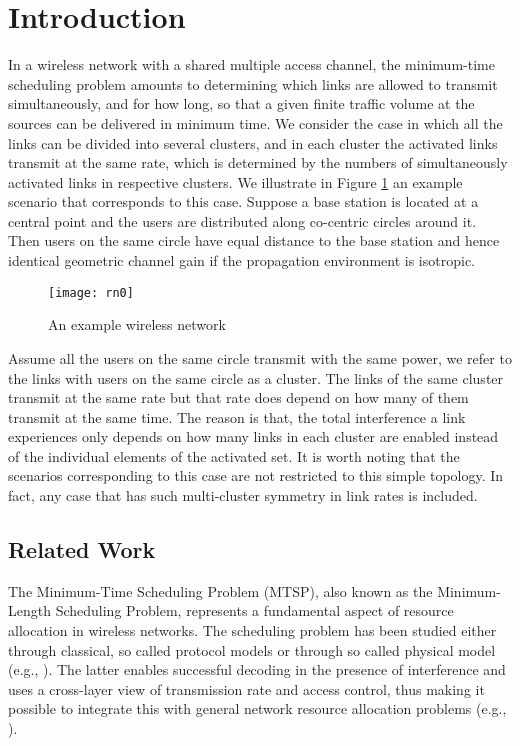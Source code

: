 \documentclass[10pt,onecolumn,journal,draftcls,oneside]{IEEEtran}
\newcounter{exam}
\begin{document}
\section{Introduction}
\label{sec:introduction}

In a wireless network with a shared multiple access channel, the minimum-time scheduling problem amounts to determining which links are allowed to transmit simultaneously, and for how long, so that a given finite traffic volume at the sources can be delivered in minimum time. We consider the case in which all the links can be divided into several clusters, and in each cluster the activated links transmit at the same rate, which is determined by the numbers of simultaneously activated links in respective clusters. We illustrate in Figure \ref{fig:rn} an example scenario that corresponds to this case. Suppose a base station is located at a central point and the users are distributed along co-centric circles around it. Then users on the same circle have equal distance to the base station and hence identical geometric channel gain if the propagation environment is isotropic.

\begin{figure} [ht!]	
\centering
{\texttt{[image: rn0]}}
\vspace{-2mm}
\caption{An example wireless network}
\label{fig:rn}
\end{figure}

Assume all the users on the same circle transmit with the same power, we refer to the links with users on the same circle as a cluster. The links of the same cluster transmit at the same rate but that rate does depend on how many of them transmit at the same time. The reason is that, the total interference a link experiences only depends on how many links in each cluster are enabled instead of the individual elements of the activated set. It is worth noting that the scenarios corresponding to this case are not restricted to this simple topology. In fact, any case that has such multi-cluster symmetry in link rates is included.

\subsection{Related Work}
The Minimum-Time Scheduling Problem (MTSP), also known as the Minimum-Length Scheduling Problem, represents a fundamental aspect of resource allocation in wireless networks. The scheduling problem has been studied either through classical, so called protocol models \cite{HaSa88,Pr89,StAm90} or through so called physical model (e.g., \cite{BjVaYu03,GrHaNi00}). The latter enables successful decoding in the presence of interference and uses a cross-layer view of transmission rate and access control, thus making it possible to integrate this with general network resource allocation problems (e.g., \cite{BoEp06,CaFiGuYu13,GeNeTa06}).
\end{document}
